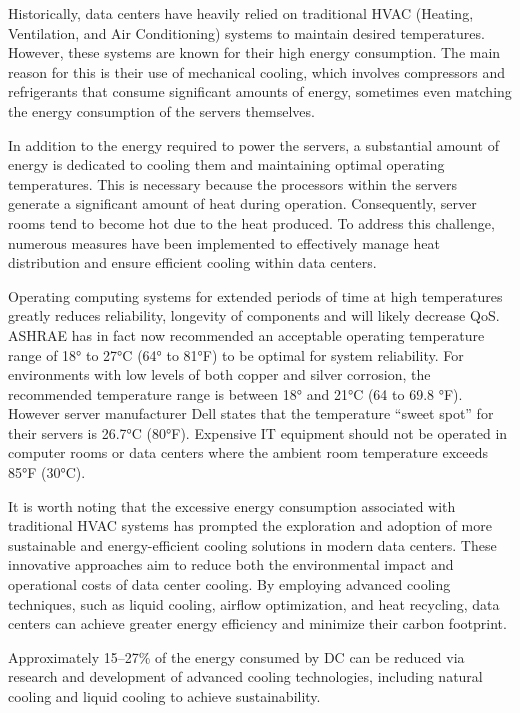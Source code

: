 \documentclass[
  a4paper,  %
  twoside,  %
  bibliography=totoc,
  headsepline,
  cleardoublepage=empty,
  parskip=half,
  draft=false
]{scrbook}
\begin{document}
Historically, data centers have heavily relied on traditional HVAC (Heating, Ventilation, and Air Conditioning) systems to maintain desired temperatures. However, these systems are known for their high energy consumption. The main reason for this is their use of mechanical cooling, which involves compressors and refrigerants that consume significant amounts of energy, sometimes even matching the energy consumption of the servers themselves.

In addition to the energy required to power the servers, a substantial amount of energy is dedicated to cooling them and maintaining optimal operating temperatures. This is necessary because the processors within the servers generate a significant amount of heat during operation. Consequently, server rooms tend to become hot due to the heat produced. To address this challenge, numerous measures have been implemented to effectively manage heat distribution and ensure efficient cooling within data centers.

Operating computing systems for extended periods of time at high temperatures
greatly reduces reliability, longevity of components and will likely decrease QoS. ASHRAE has in fact now recommended an acceptable operating temperature range of 18° to 27°C (64° to 81°F) to be optimal for system reliability. For environments with low levels of both copper and silver corrosion, the recommended temperature range is between 18° and 21°C (64 to 69.8 °F). However server manufacturer Dell states that the temperature “sweet spot” for their servers is 26.7°C (80°F)\cite{AVTECH}. Expensive IT equipment should not be operated in computer rooms or data centers where the ambient room temperature exceeds 85°F (30°C)\cite{42U_2016}.

It is worth noting that the excessive energy consumption associated with traditional HVAC systems has prompted the exploration and adoption of more sustainable and energy-efficient cooling solutions in modern data centers. These innovative approaches aim to reduce both the environmental impact and operational costs of data center cooling. By employing advanced cooling techniques, such as liquid cooling, airflow optimization, and heat recycling, data centers can achieve greater energy efficiency and minimize their carbon footprint.

Approximately 15–27\% of the energy consumed by DC can be reduced via research and development of advanced cooling technologies, including natural cooling and liquid cooling to achieve sustainability.
\end{document}
